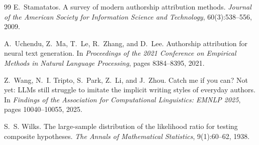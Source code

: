 \documentclass[11pt]{article}
\begin{document}
\begin{thebibliography}{99}
E.~Stamatatos.
\newblock A survey of modern authorship attribution methods.
\newblock \emph{Journal of the American Society for Information Science and
Technology}, 60(3):538--556, 2009.

A.~Uchendu, Z.~Ma, T.~Le, R.~Zhang, and D.~Lee.
\newblock Authorship attribution for neural text generation.
\newblock In \emph{Proceedings of the 2021 Conference on Empirical Methods in
Natural Language Processing}, pages 8384--8395, 2021.

Z.~Wang, N.~I. Tripto, S.~Park, Z.~Li, and J.~Zhou.
\newblock Catch me if you can? Not yet: LLMs still struggle to imitate the
implicit writing styles of everyday authors.
\newblock In \emph{Findings of the Association for Computational Linguistics:
EMNLP 2025}, pages 10040--10055, 2025.

S.~S. Wilks.
\newblock The large-sample distribution of the likelihood ratio for testing
composite hypotheses.
\newblock \emph{The Annals of Mathematical Statistics}, 9(1):60--62, 1938.

\end{thebibliography}
\end{document}
